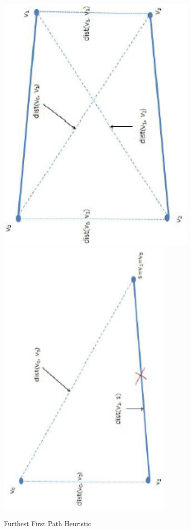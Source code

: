 \documentclass[conference]{IEEEtran}
\begin{document}
\begin{figure}[htbp]
\begin{center}
\includegraphics[scale=0.7,angle=-90]{../../images/external/location_routing/path_similarity_two_destinations}
\includegraphics[scale=0.7,angle=-90]{../../images/external/location_routing/path_similarity_one_destination}
\caption{Furthest First Path Heuristic}
\end{center}
\end{figure}
%
\end{document}
